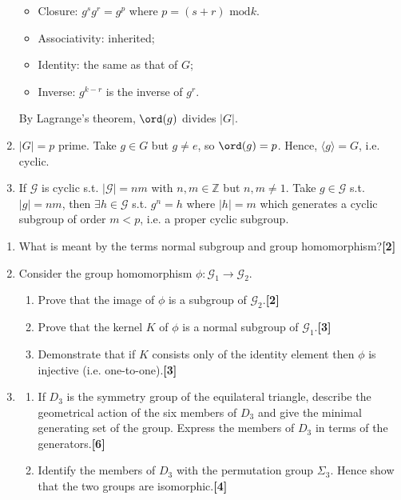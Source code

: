 \documentclass[a4paper]{article}
\begin{document}
\begin{ans}
\begin{enumerate}[label=(\roman*)]
\begin{itemize}
    \item Closure: $g^sg^r=g^{p}$ where $p=(s+r)\text{ mod}k$.
    \item Associativity: inherited;
    \item Identity: the same as that of $G$;
    \item Inverse: $g^{k-r}$ is the inverse of $g^r$.
\end{itemize}
By Lagrange's theorem, $\ord(g)$ divides $|G|$.
\item $|G|=p$ prime. Take $g\in G$ but $g\neq e$, so $\ord(g)=p$. Hence, $\langle g\rangle=G$, i.e. cyclic.
\item If $\mathcal{G}$ is cyclic s.t. $|\mathcal{G}|=nm$ with $n,m\in\mathbb{Z}$ but $n,m\neq 1$. Take $g\in\mathcal{G}$ s.t. $|g|=nm$, then $\exists h\in\mathcal{G}$ s.t. $g^n=h$ where $|h|=m$ which generates a cyclic subgroup of order $m<p$, i.e. a proper cyclic subgroup.
\end{enumerate}
\end{ans}
\newpage
\begin{qns}\leavevmode
\begin{enumerate}[label=(\roman*)]
\item What is meant by the terms normal subgroup and group homomorphism?\hfill\textbf{[2]}
\item Consider the group homomorphism $\phi:\mathcal{G}_1\rightarrow\mathcal{G}_2$.
\begin{enumerate}[label=(\alph*)]
\item Prove that the image of $\phi$ is a subgroup of $\mathcal{G}_2$.\hfill\textbf{[2]}
\item Prove that the kernel $K$ of $\phi$ is a normal subgroup of $\mathcal{G}_1$.\hfill\textbf{[3]}
\item Demonstrate that if $K$ consists only of the identity element then $\phi$ is injective (i.e. one-to-one).\hfill\textbf{[3]}
\end{enumerate}
\item
\begin{enumerate}[label=(\alph*)]
\item If $D_3$ is the symmetry group of the equilateral triangle, describe the geometrical action of the six members of $D_3$ and give the minimal generating set of the group. Express the members of $D_3$ in terms of the generators.\hfill\textbf{[6]}
\item Identify the members of $D_3$ with the permutation group $\Sigma_3$. Hence show that the two groups are isomorphic.\hfill\textbf{[4]}
\end{enumerate}
\end{enumerate}
\end{qns}
\end{document}
